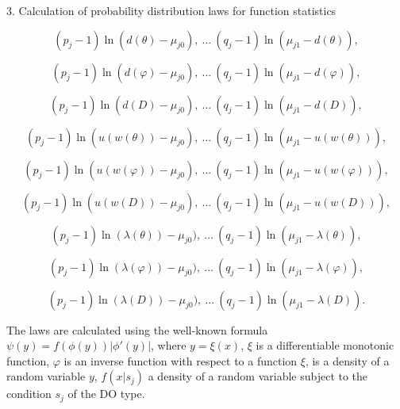 3. Calculation of probability distribution laws for function statistics

\begin{equation*}
({{p}_{j}}-1)\ln (d(\theta )-{{\mu }_{j0}}),\ ...\ ({{q}_{j}}-1)\ln ({{\mu }_{j1}}-d(\theta )),
\end{equation*}

\begin{equation*}
({{p}_{j}}-1)\ln (d(\varphi )-{{\mu }_{j0}}),\ ...\ ({{q}_{j}}-1)\ln ({{\mu }_{j1}}-d(\varphi )),
\end{equation*}

\begin{equation*}
({{p}_{j}}-1)\ln (d(D)-{{\mu }_{j0}}),\ ...\ ({{q}_{j}}-1)\ln ({{\mu }_{j1}}-d(D)),
\end{equation*}

\begin{equation*}
({{p}_{j}}-1)\ln (u(w(\theta ))-{{\mu }_{j0}}),\ ...\ ({{q}_{j}}-1)\ln ({{\mu }_{j1}}-u(w(\theta ))),
\end{equation*}

\begin{equation*}
({{p}_{j}}-1)\ln (u(w(\varphi ))-{{\mu }_{j0}}),\ ...\ ({{q}_{j}}-1)\ln ({{\mu }_{j1}}-u(w(\varphi ))),
\end{equation*}

\begin{equation*}
({{p}_{j}}-1)\ln (u(w(D))-{{\mu }_{j0}}),\ ...\ ({{q}_{j}}-1)\ln ({{\mu }_{j1}}-u(w(D))),
\end{equation*}

\begin{equation*}
({{p}_{j}}-1)\ln (\lambda (\theta ))-{{\mu }_{j0}}),\ ...\ ({{q}_{j}}-1)\ln ({{\mu }_{j1}}-\lambda (\theta )),
\end{equation*}

\begin{equation*}
({{p}_{j}}-1)\ln (\lambda (\varphi ))-{{\mu }_{j0}}),\ ...\ ({{q}_{j}}-1)\ln ({{\mu }_{j1}}-\lambda (\varphi )),
\end{equation*}

\begin{equation*}
({{p}_{j}}-1)\ln (\lambda (D))-{{\mu }_{j0}}),\ ...\ ({{q}_{j}}-1)\ln ({{\mu }_{j1}}-\lambda (D)).
\end{equation*}

The laws are calculated using the well-known formula $ \psi (y)=f(\phi (y))\left| {\phi }'(y) \right| $, where $ y=\xi (x) $, $ \xi $ is a differentiable monotonic function, $ \varphi $ is an inverse function with respect to a function  $ \xi $, is a density of a random variable $ y $, $f(x|{{s}_{j}})$ a density of a random variable  subject to the condition $ {{s}_{j}} $ of the DO type.

